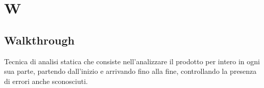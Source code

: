 \section{W}
	\subsection{Walkthrough} 
		Tecnica di analisi statica che consiste nell'analizzare il prodotto per intero in ogni sua parte, partendo dall’inizio e arrivando fino alla fine, controllando la presenza di errori anche sconosciuti.
